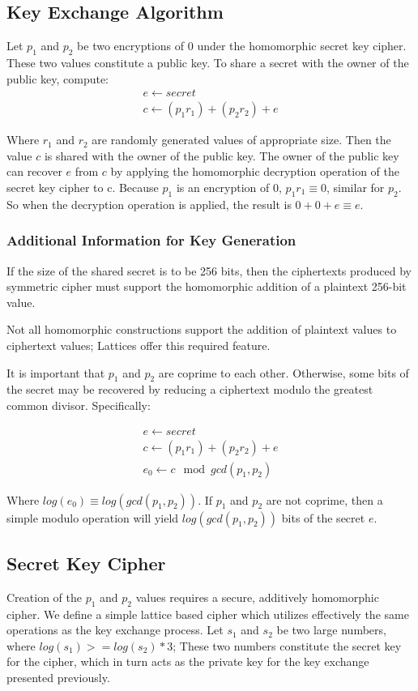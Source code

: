 \documentclass[preprint]{iacrtrans}
\begin{document}
\subsection{Key Exchange Algorithm}
Let $p_1$ and $p_2$ be two encryptions of $0$ under the homomorphic secret key cipher. These two values constitute a public key. To share a secret with the owner of the public key, compute:
\begin{align}
    e \gets secret \\
    c \gets (p_1  r_1) + (p_2 r_2) + e
\end{align}

Where $r_1$ and $r_2$ are randomly generated values of appropriate size. Then the value $c$ is shared with the owner of the public key. The owner of the public key can recover $e$ from $c$ by applying the homomorphic decryption operation of the secret key cipher to c. Because $p_1$ is an encryption of $0$, $p_1 r_1 \equiv 0$, similar for $p_2$. So when the decryption operation is applied, the result is $0 + 0 + e \equiv e$.

\subsubsection{Additional Information for Key Generation}
If the size of the shared secret is to be 256 bits, then the ciphertexts produced by symmetric cipher must support the homomorphic addition of a plaintext 256-bit value. 

Not all homomorphic constructions support the addition of plaintext values to ciphertext values; Lattices offer this required feature.

It is important that $p_1$ and $p_2$ are coprime to each other. Otherwise, some bits of the secret may be recovered by reducing a ciphertext modulo the greatest common divisor. Specifically:

\begin{align}
    e \gets secret\\
    c \gets (p_1 r_1) + (p_2 r_2) + e\\
    e_0 \gets c \mod gcd(p_1, p_2)
\end{align}

Where $log(e_0) \equiv log(gcd(p_1, p_2))$. If $p_1$ and $p_2$ are not coprime, then a simple modulo operation will yield $log(gcd(p_1, p_2))$ bits of the secret $e$.

\subsection{Secret Key Cipher}
Creation of the $p_1$ and $p_2$ values requires a secure, additively homomorphic cipher. We define a simple lattice based cipher which utilizes effectively the same operations as the key exchange process. Let $s_1$ and $s_2$ be two large numbers, where $log(s_1) >= log(s_2) * 3$; These two numbers constitute the secret key for the cipher, which in turn acts as the private key for the key exchange presented previously.\\
\end{document}
